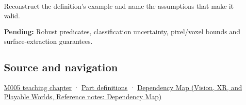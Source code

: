 Reconstruct the definition's example and name the assumptions that make it valid.

\textbf{Pending:} Robust predicates, classification uncertainty, pixel/voxel bounds and surface-extraction guarantees.

\subsection{Source and navigation}\label{appendix-c80db39080be-source-and-navigation}

\hyperref[01-foundations-i-ch001-when-arithmetic-meets-uncertainty]{M005 teaching chapter} · \hyperref[appendix-fd090d982a15-m005---parts-77-88]{Part definitions} · \href{../07-Vision-XR-and-Playable-Worlds/main.pdf\#nameddest=appendix-4ad47bdd269a}{Dependency Map (Vision, XR, and Playable Worlds, Reference notes: Dependency Map)}
